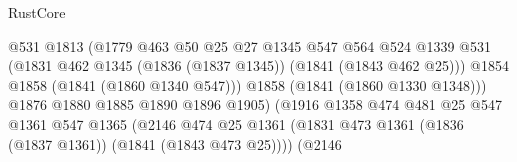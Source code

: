 \begin{lexlean}{RustCore}
\begin{coremodule}
                                              @531
                                              @1813
                                              (@1779
                                                @463
                                                @50
                                                @25
                                                @27
                                                @1345
                                                @547
                                                @564
                                                @524
                                                @1339
                                                @531
                                                (@1831
                                                  @462
                                                  @1345
                                                  (@1836 (@1837 @1345))
                                                  (@1841 (@1843 @462 @25)))
                                                @1854
                                                @1858
                                                (@1841 (@1860 @1340 @547)))
                                              @1858
                                              (@1841 (@1860 @1330 @1348)))
                                            @1876
                                            @1880
                                            @1885
                                            @1890
                                            @1896
                                            @1905)
                                          (@1916
                                            @1358
                                            @474
                                            @481
                                            @25
                                            @547
                                            @1361
                                            @547
                                            @1365
                                            (@2146
                                              @474
                                              @25
                                              @1361
                                              (@1831
                                                @473
                                                @1361
                                                (@1836 (@1837 @1361))
                                                (@1841 (@1843 @473 @25))))
                                            (@2146

\end{coremodule}
\end{lexlean}
